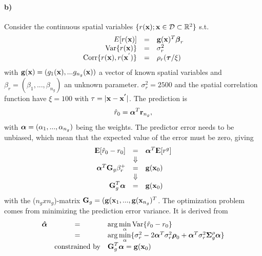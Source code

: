 \paragraph{b)}
Consider the continuous spatial variables $\{r(\boldsymbol{\mathbf{x}}); \boldsymbol{\mathbf{x}} \in \mathcal{D} \subset \mathbb{R}^2\}$ s.t.
\begin{equation}
\begin{array}{rcl}
     E[r(\boldsymbol{\mathbf{x}})] & = & \boldsymbol{\mathbf{g}}(\boldsymbol{\mathbf{x}})^T\boldsymbol{\mathbf{\beta}}_r \\
     \mathrm{Var}\{r(\boldsymbol{\mathbf{x}})\} & = & \sigma_r^2 \\
     \mathrm{Corr}\{r(\boldsymbol{\mathbf{x}}),r(\boldsymbol{\mathbf{x}}^{'})\} & = & \rho_r(\boldsymbol{\mathbf{\tau}}/\xi)
\end{array}
\end{equation}
with $\boldsymbol{\mathbf{g}}(\boldsymbol{\mathbf{x}}) = (g_1(\boldsymbol{\mathbf{x}}), ... g_{n_g}(\boldsymbol{\mathbf{x}}))$ a vector of known spatial variables and $\beta_r = (\beta_1, ..., \beta_{n_g})$ an unknown parameter. $\sigma_r^2 = 2500$ and the spatial correlation function have $\xi = 100$ with $\tau = |\boldsymbol{\mathbf{x}} - \boldsymbol{\mathbf{x^{'}}}|$. The prediction is 
\begin{equation}
    \hat{r}_0 = \boldsymbol{\mathbf{\alpha}}^T\boldsymbol{\mathbf{r}}_{n_g},
\end{equation}
with $\boldsymbol{\mathbf{\alpha}} = (\alpha_1, ..., \alpha_{n_g})$ being the weights. 
The predictor error needs to be unbiased, which mean that the expected value of the error must be zero, giving
\begin{equation*}
\begin{array}{rcl}
    {\rm I\kern-.3em E}[\hat{r}_0 - r_0] & = & \boldsymbol{\mathbf{\alpha}}^T {\rm I\kern-.3em E}[r^g]\\
      & \Downarrow & \\
      \boldsymbol{\mathbf{\alpha}}^T \boldsymbol{\mathbf{G}}_g \beta_r^+ & = & \boldsymbol{\mathbf{g}}(\boldsymbol{\mathbf{x}}_0) \\
      & \Downarrow & \\
      \boldsymbol{\mathbf{G}}_g^T \boldsymbol{\mathbf{\alpha}} & = & \boldsymbol{\mathbf{g}}(\boldsymbol{\mathbf{x}}_0)
\end{array}
\end{equation*}
with the ($n_g x n_g$)-matrix $\boldsymbol{\mathbf{G}}_g = (\boldsymbol{\mathbf{g}}(\boldsymbol{\mathbf{x}}_1,...,\boldsymbol{\mathbf{g}}(\boldsymbol{\mathbf{x}}_{n_g})^T$.
The optimization problem comes from minimizing the prediction error variance. It is derived from
\begin{equation*}
    \begin{array}{rcl}
        \boldsymbol{\mathbf{\hat{\alpha}}} & = & \arg\min\limits_\alpha \mathrm{Var}\{\hat{r}_0 - r_0\} \\
         & = & \arg\min\limits_\alpha\{\sigma_r^2 - 2\boldsymbol{\mathbf{\alpha}}^T\sigma_r^2\boldsymbol{\mathbf{\rho}}_0 + \boldsymbol{\mathbf{\alpha}}^T\sigma_r^2\boldsymbol{\mathbf{\Sigma}}_g^\rho \boldsymbol{\mathbf{\alpha}}\} \\
          & \textrm{constrained by} & \boldsymbol{\mathbf{G}}_g^T \boldsymbol{\mathbf{\alpha}} = \boldsymbol{\mathbf{g}}(\boldsymbol{\mathbf{x}}_0)
    \end{array}
\end{equation*}

